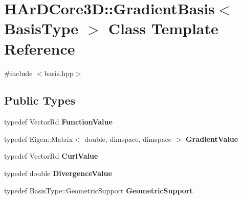 \hypertarget{classHArDCore3D_1_1GradientBasis}{}\section{H\+Ar\+D\+Core3D\+:\+:Gradient\+Basis$<$ Basis\+Type $>$ Class Template Reference}
\label{classHArDCore3D_1_1GradientBasis}


{\ttfamily \#include $<$basis.\+hpp$>$}

\subsection*{Public Types}
\begin{DoxyCompactItemize}
\item 
\mbox{\label{classHArDCore3D_1_1GradientBasis_afc6d347c3c4e36a9090cc91638bebfb4}} 
typedef Vector\+Rd {\bfseries Function\+Value}
\item 
\mbox{\label{classHArDCore3D_1_1GradientBasis_a587b8fe3f498ae7ec7bb6ed4242958fa}} 
typedef Eigen\+::\+Matrix$<$ double, dimspace, dimspace $>$ {\bfseries Gradient\+Value}
\item 
\mbox{\label{classHArDCore3D_1_1GradientBasis_ab588b4936d9f62067a8c2c5eb7572542}} 
typedef Vector\+Rd {\bfseries Curl\+Value}
\item 
\mbox{\label{classHArDCore3D_1_1GradientBasis_ab5c51bc59aeb61c403be368c4b4d4225}} 
typedef double {\bfseries Divergence\+Value}
\item 
\mbox{\label{classHArDCore3D_1_1GradientBasis_adbd840e4cc2386bbf021731e359b60b0}} 
typedef Basis\+Type\+::\+Geometric\+Support {\bfseries Geometric\+Support}
\end{DoxyCompactItemize}

